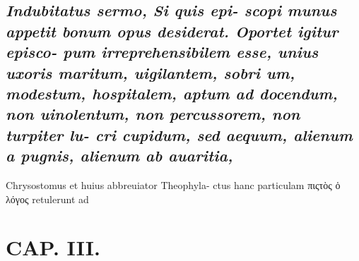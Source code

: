 \documentclass{article}
\begin{document}
\begin{pages}
\subsection*{\textit{Indubitatus sermo, Si quis epi- scopi munus appetit bonum opus desiderat. Oportet igitur episco- pum irreprehensibilem esse, unius uxoris maritum, uigilantem, sobri um, modestum, hospitalem, aptum ad docendum, non uinolentum, non percussorem, non turpiter lu- cri cupidum, sed aequum, alienum a pugnis, alienum ab auaritia, }}\pstart Chrysostomus et huius abbreuiator Theophyla- ctus hanc particulam πιςτὸς ὁ λόγος retulerunt ad  \pend
\endnumbering\beginnumbering\section{CAP. III.}\pstart   \pend
\endnumbering
\end{pages}
\end{document}

